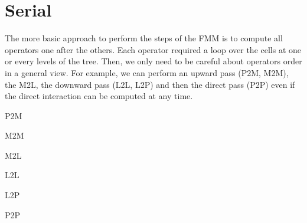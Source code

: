 \documentclass[12pt,letterpaper,titlepage]{report}
\begin{document}
\section{Serial}
The more basic approach to perform the steps of the FMM is to compute all operators one after the others.
Each operator required a loop over the cells at one or every levels of the tree.
Then, we only need to be careful about operators order in a general view.
For example, we can perform an upward pass (P2M, M2M), the M2L, the downward pass (L2L, L2P) and then the direct pass (P2P) even if the direct interaction can be computed at any time.
\BlankLine
\begin{algorithm}[H]
\linesnumbered
\SetLine
\BlankLine
{}
\BlankLine
\caption{P2M}
\end{algorithm}
\BlankLine
\begin{algorithm}[H]
\linesnumbered
\SetLine
\BlankLine
{}
\BlankLine
\caption{M2M}
\end{algorithm}
\BlankLine
\begin{algorithm}[H]
\linesnumbered
\SetLine
\BlankLine
{}
\BlankLine
\caption{M2L}
\end{algorithm}
\BlankLine
\begin{algorithm}[H]
\linesnumbered
\SetLine
\BlankLine
{}
\BlankLine
\caption{L2L}
\end{algorithm}
\BlankLine
\begin{algorithm}[H]
\linesnumbered
\SetLine
\BlankLine
{}
\BlankLine
\caption{L2P}
\end{algorithm}
\BlankLine
\begin{algorithm}[H]
\linesnumbered
\SetLine
\BlankLine
{}
\BlankLine
\caption{P2P}
\end{algorithm}
\end{document}
